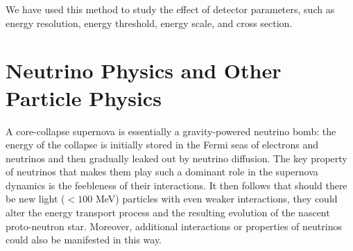   




We have used this method to study the effect of detector parameters,
such as energy resolution, energy threshold, energy scale, and cross
section.



\section{Neutrino Physics and Other Particle Physics}
\label{sec:physics-snblowe-neutrino-physics}

A core-collapse supernova is essentially a gravity-powered neutrino bomb: the energy of the collapse is initially stored in the Fermi seas of electrons and neutrinos and then gradually leaked out by neutrino diffusion. The key property of neutrinos that makes them play such a dominant role in the supernova dynamics is the feebleness of their interactions. It then follows that should there be new light ($< 100$ MeV) particles with even weaker interactions, they could alter the energy transport process and the resulting evolution of the nascent proto-neutron star. Moreover, additional interactions or properties of neutrinos could also be manifested in this way. 

